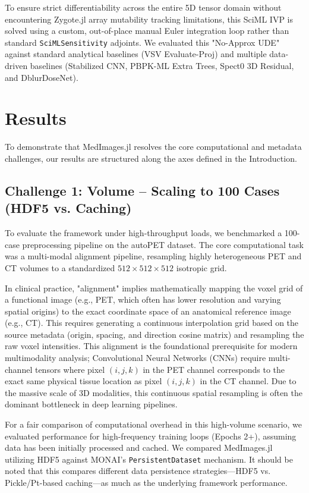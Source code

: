 \documentclass[10pt,letterpaper]{article}
\begin{document}
To ensure strict differentiability across the entire 5D tensor domain without encountering Zygote.jl array mutability tracking limitations, this SciML IVP is solved using a custom, out-of-place manual Euler integration loop rather than standard \texttt{SciMLSensitivity} adjoints. We evaluated this "No-Approx UDE" against standard analytical baselines (VSV Evaluate-Proj) and multiple data-driven baselines (Stabilized CNN, PBPK-ML Extra Trees, Spect0 3D Residual, and DblurDoseNet).


\section{Results}
To demonstrate that MedImages.jl resolves the core computational and metadata challenges, our results are structured along the axes defined in the Introduction.

\subsection*{Challenge 1: Volume -- Scaling to 100 Cases (HDF5 vs. Caching)}
To evaluate the framework under high-throughput loads, we benchmarked a 100-case preprocessing pipeline on the autoPET dataset. The core computational task was a multi-modal alignment pipeline, resampling highly heterogeneous PET and CT volumes to a standardized $512 \times 512 \times 512$ isotropic grid. 

In clinical practice, "alignment" implies mathematically mapping the voxel grid of a functional image (e.g., PET, which often has lower resolution and varying spatial origins) to the exact coordinate space of an anatomical reference image (e.g., CT). This requires generating a continuous interpolation grid based on the source metadata (origin, spacing, and direction cosine matrix) and resampling the raw voxel intensities. This alignment is the foundational prerequisite for modern multimodality analysis; Convolutional Neural Networks (CNNs) require multi-channel tensors where pixel $(i,j,k)$ in the PET channel corresponds to the exact same physical tissue location as pixel $(i,j,k)$ in the CT channel. Due to the massive scale of 3D modalities, this continuous spatial resampling is often the dominant bottleneck in deep learning pipelines.

For a fair comparison of computational overhead in this high-volume scenario, we evaluated performance for high-frequency training loops (Epochs 2+), assuming data has been initially processed and cached. We compared MedImages.jl utilizing HDF5 against MONAI's \texttt{PersistentDataset} mechanism. It should be noted that this compares different data persistence strategies—HDF5 vs. Pickle/Pt-based caching—as much as the underlying framework performance.
\end{document}
